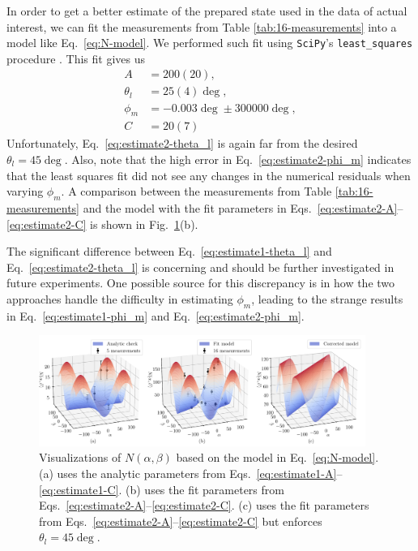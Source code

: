 \documentclass{../paper}
\newcommand{\eq}[1]{Eq.~\eqref{#1}}
\newcommand{\eqs}[2]{Eqs.~\eqref{#1}--\eqref{#2}}
\newcommand{\fig}[1]{Fig.~\ref{#1}}
\begin{document}
In order to get a better estimate of the prepared state used in the data of actual interest, we can fit the measurements from Table \ref{tab:16-measurements} into a model like \eq{eq:N-model}. We performed such fit using {\tt SciPy}'s {\tt least\_squares} procedure \cite{SciPy}. This fit gives us
\begin{align}
  A &= 200(20), \label{eq:estimate2-A} \\
  \theta_l &= 25(4)\deg, \label{eq:estimate2-theta_l} \\
  \phi_m &= -0.003\deg \pm 300000\deg, \label{eq:estimate2-phi_m} \\
  C &= 20(7) \label{eq:estimate2-C}
\end{align}
Unfortunately, \eq{eq:estimate2-theta_l} is again far from the desired $\theta_l = 45\deg$. Also, note that the high error in \eq{eq:estimate2-phi_m} indicates that the least squares fit did not see any changes in the numerical residuals when varying $\phi_m$. A comparison between the measurements from Table \ref{tab:16-measurements} and the model with the fit parameters in \eqs{eq:estimate2-A}{eq:estimate2-C} is shown in \fig{fig:state}(b).

The significant difference between \eq{eq:estimate1-theta_l} and \eq{eq:estimate2-theta_l} is concerning and should be further investigated in future experiments. One possible source for this discrepancy is in how the two approaches handle the difficulty in estimating $\phi_m$, leading to the strange results in \eq{eq:estimate1-phi_m} and \eq{eq:estimate2-phi_m}.

\begin{figure}
  \centering
  \includegraphics[width=0.95\textwidth]{analysis/state.pdf}
  \caption{Visualizations of $N(\alpha,\beta)$ based on the model in \eq{eq:N-model}. (a) uses the analytic parameters from \eqs{eq:estimate1-A}{eq:estimate1-C}. (b) uses the fit parameters from \eqs{eq:estimate2-A}{eq:estimate2-C}. (c) uses the fit parameters from \eqs{eq:estimate2-A}{eq:estimate2-C} but enforces $\theta_l = 45\deg$.}
  \label{fig:state}
\end{figure}
\end{document}
